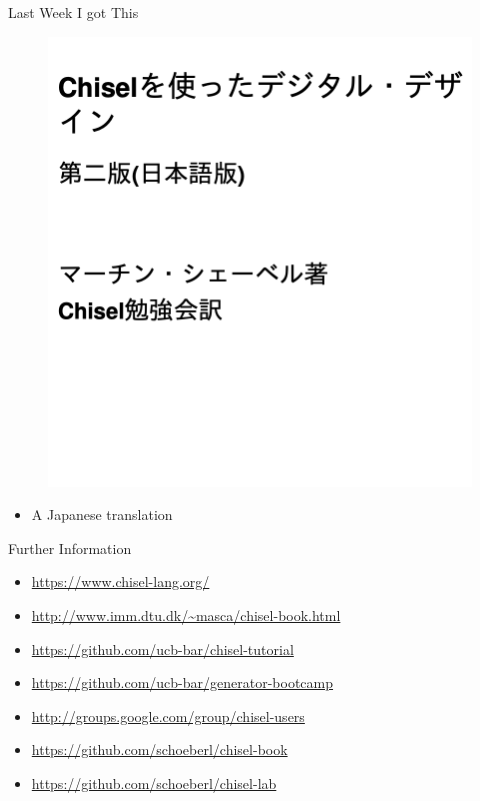 \begin{frame}[fragile]{Last Week I got This}
\begin{figure}
    \centering
    \includegraphics[scale=0.4]{../japanese}
\end{figure}

\begin{itemize}
\item A Japanese translation
\end{itemize}
\end{frame}

\begin{frame}[fragile]{Further Information}
\begin{itemize}
\item \url{https://www.chisel-lang.org/}
\item \url{http://www.imm.dtu.dk/~masca/chisel-book.html}
\item \url{https://github.com/ucb-bar/chisel-tutorial}
\item \url{https://github.com/ucb-bar/generator-bootcamp}
\item \url{http://groups.google.com/group/chisel-users}
\item \url{https://github.com/schoeberl/chisel-book}
\item \url{https://github.com/schoeberl/chisel-lab}
\end{itemize}
\end{frame}


